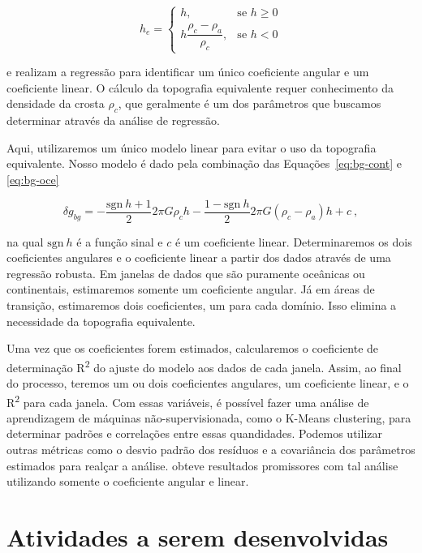 \documentclass[onecolumn,a4paper,11pt]{article}
\begin{document}
\begin{equation}
    h_e = \begin{cases}
        h, & \text{se } h \geq 0
        \\
        h \dfrac{\rho_c - \rho_a}{\rho_c}, & \text{se } h < 0
    \end{cases}
\end{equation}

\noindent
e realizam a regressão para identificar um único coeficiente angular e um coeficiente linear. O cálculo da topografia equivalente requer conhecimento da densidade da crosta $\rho_c$, que geralmente é um dos parâmetros que buscamos determinar através da análise de regressão.

Aqui, utilizaremos um único modelo linear para evitar o uso da topografia equivalente. Nosso modelo é dado pela combinação das Equações~\ref{eq:bg-cont} e \ref{eq:bg-oce}

\begin{equation}
    \delta g_{bg} =
    - \dfrac{\text{sgn}\ h + 1}{2} 2 \pi G \rho_c h
    - \dfrac{1 - \text{sgn}\ h}{2} 2 \pi G (\rho_{c} - \rho_a) h
    + c\ ,
    \label{eq:modelo}
\end{equation}

\noindent
na qual $\text{sgn}\ h$ é a função sinal e $c$ é um coeficiente linear.
Determinaremos os dois coeficientes angulares e o coeficiente linear a partir dos dados através de uma regressão robusta. Em janelas de dados que são puramente oceânicas ou continentais, estimaremos somente um coeficiente angular. Já em áreas de transição, estimaremos dois coeficientes, um para cada domínio. Isso elimina a necessidade da topografia equivalente.

Uma vez que os coeficientes forem estimados, calcularemos o coeficiente de determinação R\textsuperscript{2} do ajuste do modelo aos dados de cada janela. Assim, ao final do processo, teremos um ou dois coeficientes angulares, um coeficiente linear, e o R\textsuperscript{2} para cada janela. Com essas variáveis, é possível fazer uma análise de aprendizagem de máquinas não-supervisionada, como o K-Means clustering, para determinar padrões e correlações entre essas quandidades. Podemos utilizar outras métricas como o desvio padrão dos resíduos e a covariância dos parâmetros estimados para realçar a análise. \citet{Pivetta2020} obteve resultados promissores com tal análise utilizando somente o coeficiente angular e linear.

\section{Atividades a serem desenvolvidas}
\end{document}
